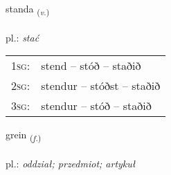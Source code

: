 \documentclass[frontgrid, backgrid]{flacards}\usepackage[]{graphicx}\usepackage[]{xcolor}
\begin{document}
{standa \small{\textsubscript{(\textit{v.})}} \\[1ex] %
\textphonetic{[stanta]} \\
pl.: \emph{stać} \\  [2ex]
\renewcommand*{\arraystretch}{0.8}
\begin{tabular}{p{1cm}l}
\textsc{1sg}: & stend -- stóð -- staðið \\ 
\textsc{2sg}: & stendur -- stóðst -- staðið \\ 
\textsc{3sg}: & stendur -- stóð -- staðið \\ 
\end{tabular}
}

\renewcommand{\flhead}{\vskip5pt \fboxsep=0pt {\small\bfseries\footnotesize Nafnorð | rzeczownik}}
\renewcommand{\fcfoot}{\vskip5pt \fboxsep=0pt \hspace{2pt}{\small\bfseries\footnotesize 1K}}

\renewcommand{\blhead}{\vskip5pt {\small\bfseries\footnotesize Nafnorð | rzeczownik }}
\renewcommand{\bcfoot}{\vskip5pt \hspace{2pt}{\small\bfseries\footnotesize 1K}}


{grein \small{\textsubscript{(\textit{f.})}} \\[1ex] %
\textphonetic{[kreiːn]} \\
pl.: \emph{oddział; przedmiot; artykuł} \\  [2ex]
\renewcommand*{\arraystretch}{0.8}
}

\renewcommand{\flhead}{\vskip5pt \fboxsep=0pt {\small\bfseries\footnotesize Greinir | article}}
\renewcommand{\fcfoot}{\vskip5pt \fboxsep=0pt \hspace{2pt}{\small\bfseries\footnotesize 1K}}
\end{document}
